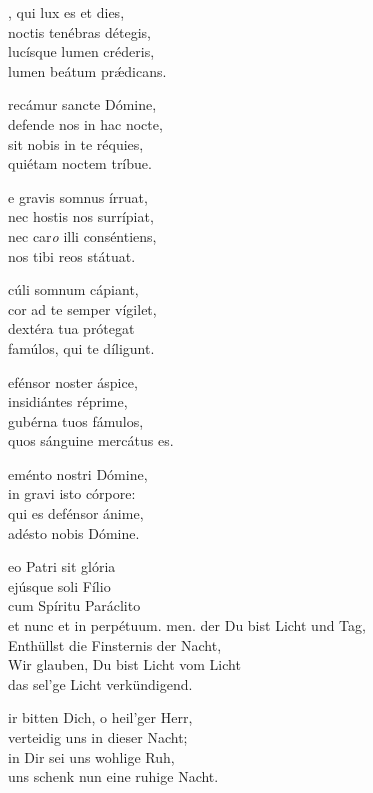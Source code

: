 \documentclass[fontsize=10pt,paper=A5,twoside,BCOR=1mm,DIV=21,headinclude]{scrarticle}
\begin{document}
\begin{paracol}{2}\pcb
\begin{hymnus}
, qui lux es et dies,\\
\hspace{1.6em} noctis tenébras détegis,\\
lucísque lumen créderis,\\
lumen beátum pr\'ædicans.

recámur sancte Dómine,\\
defende nos in hac nocte,\\
sit nobis in te réquies,\\
quiétam noctem tríbue.

e gravis somnus írruat,\\
nec hostis nos surrípiat,\\
nec car\textit{o} illi conséntiens,\\
nos tibi reos státuat.

cúli somnum cápiant,\\
cor ad te semper vígilet,\\
dextéra tua prótegat\\
famúlos, qui te díligunt.

efénsor noster áspice,\\
insidiántes réprime,\\
gubérna tuos fámulos,\\
quos sánguine mercátus es.

eménto nostri Dómine,\\
in gravi isto córpore:\\
qui es defénsor ánime,\\
adésto nobis Dómine.

eo Patri sit glória\\
ejúsque soli Fílio\\
cum Spíritu Paráclito\\
et nunc et in perpétuum. men.
	\switchcolumn
	 der Du bist Licht und Tag,\\
	\hspace{1.6em} Enthüllst die Finsternis der Nacht,\\
	Wir glauben, Du bist Licht vom Licht\\
	das sel'ge Licht verkündigend.

	ir bitten Dich, o heil'ger Herr,\\
	verteidig uns in dieser Nacht;\\
	in Dir sei uns wohlige Ruh,\\
	uns schenk nun eine ruhige Nacht.


\end{hymnus}
\end{paracol}
\end{document}
